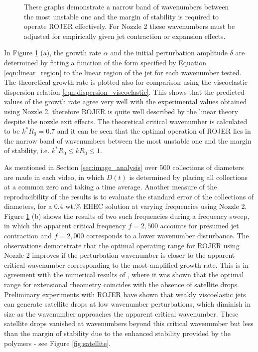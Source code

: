 \documentclass[11pt]{article}
\begin{document}
\begin{figure}[h]
\begin{subfigure}
		\caption{The normalised jet midfilament diameter $D(t)/D_0$ for EHEC 
wt.\% $\left(Oh = 0.07, We = 20.5 \right)$. The jet is perturbed at apparent 
critical frequency $f = 2,500 Hz$ corresponding to the most amplified growth 
rate, and a lower frequency $f = 2,000 Hz$ corresponding to a wavenumber lower 
than the critical.}
	\end{subfigure}
	\caption{These graphs demonstrate a narrow band of wavenumbers between the 
most unstable one and the margin of stability is required to operate ROJER 
effectively. For Nozzle 2 these wavenumbers must be adjusted for empirically 
given jet contraction or expansion effects.}
	\label{fig:sweep7}
\end{figure}

In Figure \ref{fig:sweep7} (a), the growth rate $\alpha$ and the initial 
perturbation amplitude $\delta$ are determined by fitting a function of the 
form specified by Equation \ref{eqn:linear_region} to the linear region of the 
jet for each wavenumber tested. The theoretical growth rate is plotted also for 
comparison using the viscoelastic dispersion relation 
\ref{eqn:dispersion_viscoelastic}. This shows that the predicted values of the 
growth rate agree very well with the experimental values obtained using Nozzle 
2, therefore ROJER is quite well described by the linear theory despite the 
nozzle exit effects. The theoretical critical wavenumber is calculated to be 
$k^*R_0 = 0.7$ and it can be seen that the optimal operation of ROJER lies in 
the narrow band of wavenumbers between the most unstable one and the margin of 
stability, i.e. $k^* R_0 \leq k R_0 \leq 1$.

As mentioned in Section \ref{sec:image_analysis} over $500$ collections of 
diameters are made in each video, in which $D(t)$ is determined by placing all 
collections at a common zero and taking a time average. Another measure of the 
reproducibility of the results is to evaluate the standard error of the 
collections of diameters, for a 0.4 wt.\% EHEC solution at varying frequencies 
using Nozzle 2. Figure \ref{fig:sweep7} (b) shows the results of two such 
frequencies during a frequency sweep, in which the apparent critical frequency 
$f = 2,500$ accounts for presumed jet contraction and $f = 2,000$ corresponds 
to a lower wavenumber disturbance. The observations demonstrate that the 
optimal operating range for ROJER using Nozzle 2 improves if the perturbation 
wavenumber is closer to the apparent critical wavenumber corresponding to the 
most amplified growth rate. This is in agreement with the numerical results of 
\cite{ardekani2010dynamics}, where it was shown that the optimal range for 
extensional rheometry coincides with the absence of satellite drops. 
Preliminary experiments with ROJER have shown that weakly viscoelastic jets can 
generate satellite drops at low wavenumber perturbations, which diminish in 
size as the wavenumber approaches the apparent critical wavenumber. These 
satellite drops vanished at wavenumbers beyond this critical wavenumber but 
less than the margin of stability due to the enhanced stability provided by the 
polymers - see Figure \ref{fig:satellite}. 
\end{document}
